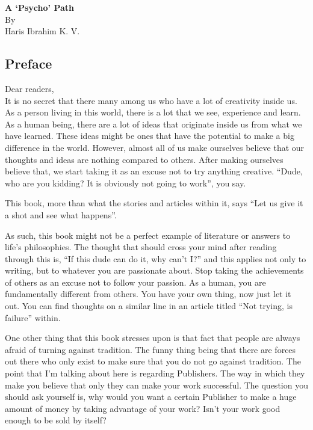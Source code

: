\documentclass[twoside,11pt,titlepage]{article}
\begin{document}
\thispagestyle{plain}
\bigskip
\bigskip
\bigskip
\bigskip
\begin{center}
  \huge{\textbf{A `Psycho' Path}}\\
  \bigskip
  \Large{By}\\
  \bigskip
  \LARGE{Haris Ibrahim K. V.}
\end{center}

\newpage
\thispagestyle{plain}
\tableofcontents
\newpage
\begin{center}
  \section{Preface}
\end{center}
Dear readers,\\

It is no secret that there many among us who have a lot of creativity inside us. As a person living in this world, there is a lot that we see, experience and learn. As a human being, there are a lot of ideas that originate inside us from what we have learned. These ideas might be ones that have the potential to make a big difference in the world. However, almost all of us make ourselves believe that our thoughts and ideas are nothing compared to others. After making ourselves believe that, we start taking it as an excuse not to try anything creative. ``Dude, who are you kidding? It is obviously not going to work'', you say.

This book, more than what the stories and articles within it, says ``Let us give it a shot and see what happens''.

As such, this book might not be a perfect example of literature or answers to life's philosophies. The thought that should cross your mind after reading through this is, ``If this dude can do it, why can't I?'' and this applies not only to writing, but to whatever you are passionate about. Stop taking the achievements of others as an excuse not to follow your passion. As a human, you are fundamentally different from others. You have your own thing, now just let it out. You can find thoughts on a similar line in an article titled ``Not trying, is failure'' within.

One other thing that this book stresses upon is that fact that people are always afraid of turning against tradition. The funny thing being that there are forces out there who only exist to make sure that you do not go against tradition. The point that I'm talking about here is regarding Publishers. The way in which they make you believe that only they can make your work successful. The question you should ask yourself is, why would you want a certain Publisher to make a huge amount of money by taking advantage of your work? Isn't your work good enough to be sold by itself? 
\end{document}
